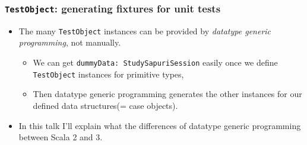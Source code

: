 \begin{frame}
  \frametitle{\lstinline|TestObject|: generating fixtures for unit tests}

  \begin{itemize}
    \item The many \lstinline|TestObject| instances can be provided by
    \emph{datatype generic programming}, not manually.
    \begin{itemize}
      \item We can get \lstinline|dummyData: StudySapuriSession| easily once we define
      \lstinline|TestObject| instances for primitive types,
      \item Then datatype generic programming generates the other instances for our
      defined data structures(= case objects).
    \end{itemize}

    \item In this talk I'll explain what the differences of datatype generic programming
    between Scala 2 and 3.
  \end{itemize}

\end{frame}

